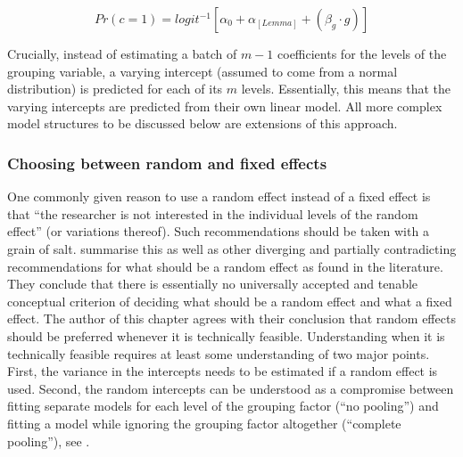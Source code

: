 \begin{equation}
  Pr(c=1)=logit^{-1}\left[\alpha_0+\alpha_{[Lemma]}+(\beta_{g}\cdot g)\right]
  \label{eq:002a}
\end{equation}

Crucially, instead of estimating a batch of $m-1$ coefficients for the levels of the grouping variable, a varying intercept (assumed to come from a normal distribution) is predicted for each of its $m$ levels.
Essentially, this means that the varying intercepts are predicted from their own linear model.
All more complex model structures to be discussed below are extensions of this approach.

\subsubsection{Choosing between random and fixed effects}
\label{sec:choosingbetweenrandomandfixedeffects}

One commonly given reason to use a random effect instead of a fixed effect is that ``the researcher is not interested in the individual levels of the random effect'' (or variations thereof).
Such recommendations should be taken with a grain of salt.
\citet[245--247]{GelmanHill2006} summarise this as well as other diverging and partially contradicting recommendations for what should be a random effect as found in the literature.
They conclude that there is essentially no universally accepted and tenable conceptual criterion of deciding what should be a random effect and what a fixed effect.
The author of this chapter agrees with their conclusion that random effects should be preferred whenever it is technically feasible.
Understanding when it is technically feasible requires at least some understanding of two major points.
First, the variance in the intercepts needs to be estimated if a random effect is used.
Second, the random intercepts can be understood as a compromise between fitting separate models for each level of the grouping factor (``no pooling'') and fitting a model while ignoring the grouping factor altogether (``complete pooling''), see \citet[Ch.~12]{GelmanHill2006}.

